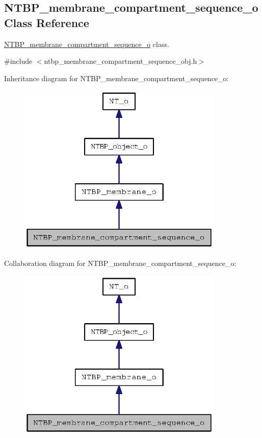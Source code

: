 \subsection{NTBP\_\-membrane\_\-compartment\_\-sequence\_\-o Class Reference}
\label{class_n_t_b_p__membrane__compartment__sequence__o}


\hyperlink{class_n_t_b_p__membrane__compartment__sequence__o}{NTBP\_\-membrane\_\-compartment\_\-sequence\_\-o} class.  




{\ttfamily \#include $<$ntbp\_\-membrane\_\-compartment\_\-sequence\_\-obj.h$>$}



Inheritance diagram for NTBP\_\-membrane\_\-compartment\_\-sequence\_\-o:
\nopagebreak
\begin{figure}[H]
\begin{center}
\leavevmode
\includegraphics[width=278pt]{class_n_t_b_p__membrane__compartment__sequence__o__inherit__graph}
\end{center}
\end{figure}


Collaboration diagram for NTBP\_\-membrane\_\-compartment\_\-sequence\_\-o:
\nopagebreak
\begin{figure}[H]
\begin{center}
\leavevmode
\includegraphics[width=278pt]{class_n_t_b_p__membrane__compartment__sequence__o__coll__graph}
\end{center}
\end{figure}

